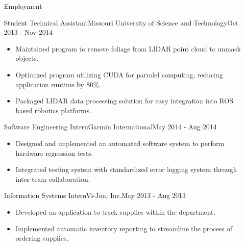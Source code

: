 \documentclass[]{mcdowellcv}
\begin{document}
\begin{cvsection}{Employment}
\begin{rockmech}
    \begin{cvsubsection}[2]{Student Technical Assistant}{Missouri University of Science and Technology}{Oct 2013 - Nov 2014}        
        \begin{itemize}
            \item Maintained program to remove foliage from LIDAR point cloud to unmask objects.
            \item Optimized program utilizing CUDA for parralel computing, reducing application runtime by 80\%.
            \item Packaged LIDAR data processing solution for easy integration into ROS based robotics platforms. 
        \end{itemize}
    \end{cvsubsection}
\end{rockmech}
    
\begin{garmin}
    \begin{cvsubsection}{Software Engineering Intern}{Garmin International}{May 2014 - Aug 2014}   
        \begin{itemize}
            \item Designed and implemented an automated software system to perform hardware regression tests.
            \item Integrated testing system with standardized error logging system through inter-team collaboration.
        \end{itemize}
    \end{cvsubsection}
\end{garmin}

\begin{vijon}
    \begin{cvsubsection}{Information Systems Intern}{Vi-Jon, Inc.}{May 2013 - Aug 2013}
        \begin{itemize}
            \item Developed an application to track supplies within the department.
            \item Implemented automatic inventory reporting to streamline the process of ordering supplies.
        \end{itemize}
    \end{cvsubsection}
\end{vijon}

\end{cvsection}
\end{document}
